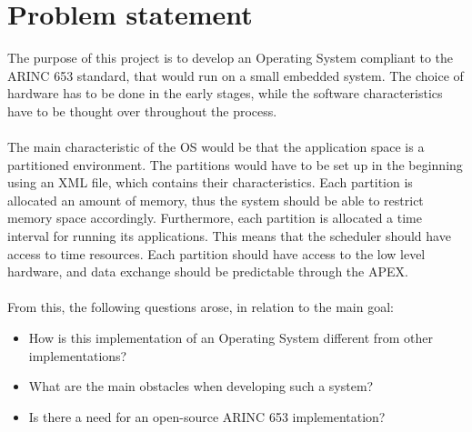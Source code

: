 \chapter{Problem statement}


The purpose of this project is to develop an Operating System compliant to the 
ARINC 653 standard, that would run on a small embedded system. 
The choice of hardware has to be done in the early stages, while the software characteristics
have to be thought over throughout the process.
\\\\
The main characteristic of the OS would be that the application space is a partitioned environment.
The partitions would have to be set up in the beginning using an XML file, which contains their 
characteristics. Each partition is allocated an amount of memory, thus the system should be able to restrict memory space accordingly.
Furthermore, each partition is allocated a time interval for running its applications. This means
that the scheduler should have access to time resources. Each partition should have access to the 
low level hardware, and data exchange should be predictable through the APEX. 
\\\\
From this, the following questions arose, in relation to the main goal:
\begin{itemize}
	
	\item How is this implementation of an Operating System different from other implementations?
	\item What are the main obstacles when developing such a system?
	
	\item Is there a need for an open-source ARINC 653 implementation?

\end{itemize}